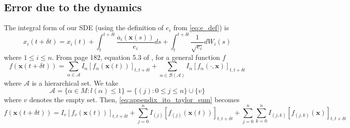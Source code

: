 \subsection{Error due to the dynamics}

The integral form of our SDE (using the definition of $e_i$ from \eqref{eq:e_def}) is
\begin{equation}
x_{i}(t + \delta t) = x_{i}(t) + \int_{t}^{t + \delta t} \frac{a_i(\mathbf{x}(s))}{e_i} ds + \int_{t}^{t+\delta t} \frac{1}{\sqrt{e_i}} dW_i(s)
\end{equation}
where $1 \le i \le n$. 
%
From page 182, equation 5.3 of \cite{kloeden1992numerical}, for a general function $f$
%
\begin{equation} \label{eq:appendix_ito_taylor_sum}
f(\mathbf{x}(t+\delta t)) = \sum_{\alpha \in \mathcal{A}} I_\alpha[f_\alpha (\mathbf{x}(t))]_{t, t+\delta t} + \sum_{\alpha \in \mathcal{B}(\mathcal{A})} I_\alpha [f_\alpha(\cdot, \mathbf{x})]_{t, t+\delta t}
\end{equation}
where $\mathcal{A}$ is a hierarchical set. 
%
We take 
\begin{equation}
 \mathcal{A} = \{ \alpha \in M : l(\alpha) \le 1 \} = \{ (j) : 0 \le j \le n \} \cup \{v \}
\end{equation}
%
where $v$ denotes the empty set.
%
Then, \eqref{eq:appendix_ito_taylor_sum} becomes
\begin{equation} \label{eq:general_ito_taylor_sum}
f(\mathbf{x}(t+\delta t)) = I_{v} [f_v(\mathbf{x}(t))]_{t, t+\delta t} + \sum_{j=0}^n I_{(j)} [f_{(j)}(\mathbf{x}(t))]_{t, t+\delta t} + \sum_{j=0}^n \sum_{k=0}^n I_{(j,k)} [f_{(j,k)} ( \mathbf{x} )]_{t, t+\delta t}
\end{equation}

